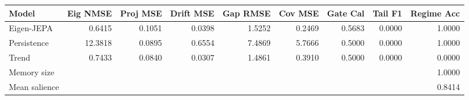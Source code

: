 \begin{tabular}{lrrrrrrrr}
\toprule
Model & Eig NMSE & Proj MSE & Drift MSE & Gap RMSE & Cov MSE & Gate Cal & Tail F1 & Regime Acc \\
\midrule
Eigen-JEPA & 0.6415 & 0.1051 & 0.0398 & 1.5252 & 0.2469 & 0.5683 & 0.0000 & 1.0000 \\
Persistence & 12.3818 & 0.0895 & 0.6554 & 7.4869 & 5.7666 & 0.5000 & 0.0000 & 1.0000 \\
Trend & 0.7433 & 0.0840 & 0.0307 & 1.4861 & 0.3910 & 0.5000 & 0.0000 & 0.0000 \\
\midrule
Memory size & \multicolumn{8}{r}{1.0000} \\
Mean salience & \multicolumn{8}{r}{0.8414} \\
\bottomrule
\end{tabular}